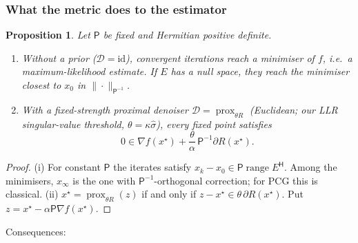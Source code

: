 \documentclass[11pt]{article}
\newtheorem{proposition}{Proposition}
\theoremstyle{remark}
\newcommand{\herm}{\mathsf H}
\begin{document}
\subsubsection*{What the metric does to the estimator}
\begin{proposition}\label{prop:metricfp}
Let $\mathsf P$ be fixed and Hermitian positive definite.
\begin{enumerate}
  \item[(i)] Without a prior ($\mathcal D=\mathrm{id}$), convergent iterations reach a minimiser of $f$, i.e.\ a maximum-likelihood estimate. If $E$ has a null space, they reach the minimiser closest to $x_0$ in $\|\cdot\|_{\mathsf P^{-1}}$.
  \item[(ii)] With a fixed-strength proximal denoiser $\mathcal D=\operatorname{prox}_{\theta R}$ (Euclidean; our LLR singular-value threshold, $\theta=\kappa\hat\sigma$), every fixed point satisfies
  \begin{equation}
    0\in\nabla f(x^\star)+\frac\theta\alpha\,\mathsf P^{-1}\partial R(x^\star).
    \label{eq:metricfp}
  \end{equation}
\end{enumerate}
\end{proposition}
\begin{proof}
(i) For constant $\mathsf P$ the iterates satisfy $x_k-x_0\in\mathsf P\operatorname{range}E^\herm$. Among the minimisers, $x_\infty$ is the one with $\mathsf P^{-1}$-orthogonal correction; for PCG this is classical.
(ii) $x^\star=\operatorname{prox}_{\theta R}(z)$ if and only if $z-x^\star\in\theta\,\partial R(x^\star)$. Put $z=x^\star-\alpha\mathsf P\nabla f(x^\star)$.
\end{proof}
Consequences:
\end{document}
